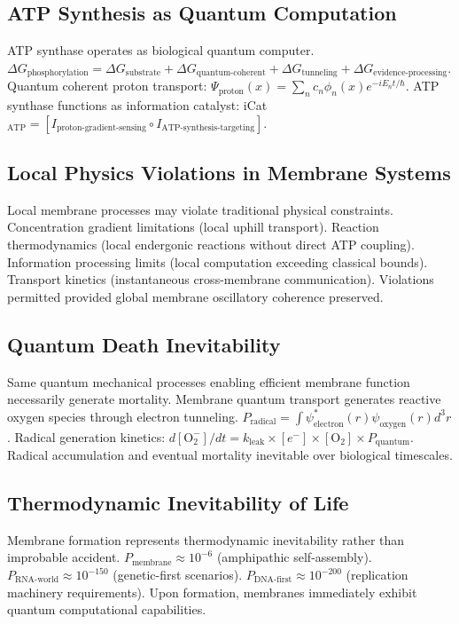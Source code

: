 \documentclass[12pt,a4paper]{article}
\begin{document}
\subsection{ATP Synthesis as Quantum Computation}

ATP synthase operates as biological quantum computer. $\Delta G_{\text{phosphorylation}} = \Delta G_{\text{substrate}} + \Delta G_{\text{quantum-coherent}} + \Delta G_{\text{tunneling}} + \Delta G_{\text{evidence-processing}}$. Quantum coherent proton transport: $\Psi_{\text{proton}}(x) = \sum_n c_n \phi_n(x) e^{-iE_n t/\hbar}$. ATP synthase functions as information catalyst: iCat$_{\text{ATP}} = [I_{\text{proton-gradient-sensing}} \circ I_{\text{ATP-synthesis-targeting}}]$.

\subsection{Local Physics Violations in Membrane Systems}

Local membrane processes may violate traditional physical constraints. Concentration gradient limitations (local uphill transport). Reaction thermodynamics (local endergonic reactions without direct ATP coupling). Information processing limits (local computation exceeding classical bounds). Transport kinetics (instantaneous cross-membrane communication). Violations permitted provided global membrane oscillatory coherence preserved.

\subsection{Quantum Death Inevitability}

Same quantum mechanical processes enabling efficient membrane function necessarily generate mortality. Membrane quantum transport generates reactive oxygen species through electron tunneling. $P_{\text{radical}} = \int \psi_{\text{electron}}^*(r) \psi_{\text{oxygen}}(r) d^3r$. Radical generation kinetics: $d[\text{O}_2^-]/dt = k_{\text{leak}} \times [e^-] \times [\text{O}_2] \times P_{\text{quantum}}$. Radical accumulation and eventual mortality inevitable over biological timescales.

\subsection{Thermodynamic Inevitability of Life}

Membrane formation represents thermodynamic inevitability rather than improbable accident. $P_{\text{membrane}} \approx 10^{-6}$ (amphipathic self-assembly). $P_{\text{RNA-world}} \approx 10^{-150}$ (genetic-first scenarios). $P_{\text{DNA-first}} \approx 10^{-200}$ (replication machinery requirements). Upon formation, membranes immediately exhibit quantum computational capabilities.
\end{document}
